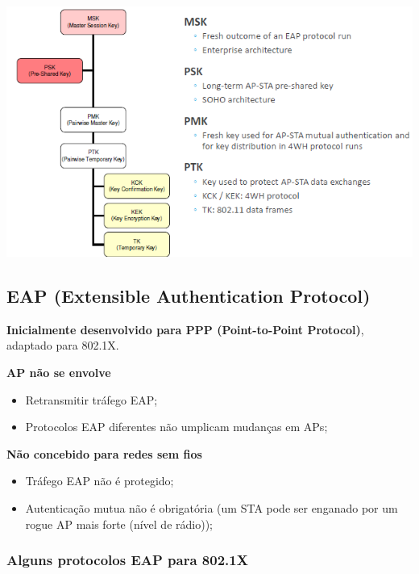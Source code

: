 \documentclass{article}
\begin{document}
\begin{center}
  \includegraphics[scale=0.6]{55}
\end{center}

\subsection{EAP (Extensible Authentication Protocol)}

\begin{flushleft}
  \textbf{Inicialmente desenvolvido para PPP (Point-to-Point Protocol)},
  adaptado para 802.1X.

  \vspace{2mm}

  \textbf{AP não se envolve}
  \begin{itemize}
    \item Retransmitir tráfego EAP;
    \item Protocolos EAP diferentes não umplicam mudanças em APs;
  \end{itemize}

  \textbf{Não concebido para redes sem fios}
  \begin{itemize}
    \item Tráfego EAP não é protegido;
    \item Autenticação mutua não é obrigatória (um STA pode ser enganado
    por um rogue AP mais forte (nível de rádio));
  \end{itemize}
\end{flushleft}

\subsubsection{Alguns protocolos EAP para 802.1X}
\end{document}
